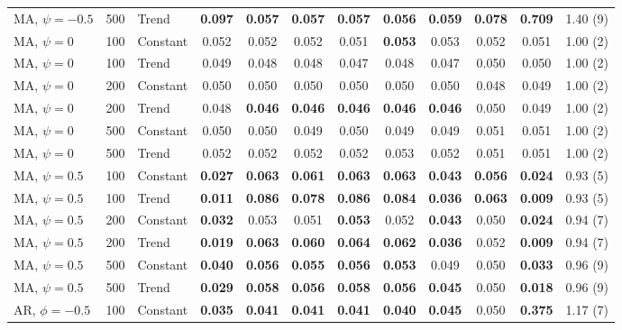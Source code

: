 \begin{tabular}{lrlccccccccc}
MA, $\psi = -0.5$ & 500 & Trend & \textbf{0.097} & \textbf{0.057} & \textbf{0.057} & \textbf{0.057} & \textbf{0.056} & \textbf{0.059} & \textbf{0.078} & \textbf{0.709} & 1.40 (9) \\
\addlinespace
MA, $\psi = 0$ & 100 & Constant & 0.052 & 0.052 & 0.052 & 0.051 & \textbf{0.053} & 0.053 & 0.052 & 0.051 & 1.00 (2) \\
MA, $\psi = 0$ & 100 & Trend & 0.049 & 0.048 & 0.048 & 0.047 & 0.048 & 0.047 & 0.050 & 0.050 & 1.00 (2) \\
MA, $\psi = 0$ & 200 & Constant & 0.050 & 0.050 & 0.050 & 0.050 & 0.050 & 0.050 & 0.048 & 0.049 & 1.00 (2) \\
MA, $\psi = 0$ & 200 & Trend & 0.048 & \textbf{0.046} & \textbf{0.046} & \textbf{0.046} & \textbf{0.046} & \textbf{0.046} & 0.050 & 0.049 & 1.00 (2) \\
MA, $\psi = 0$ & 500 & Constant & 0.050 & 0.050 & 0.049 & 0.050 & 0.049 & 0.049 & 0.051 & 0.051 & 1.00 (2) \\
MA, $\psi = 0$ & 500 & Trend & 0.052 & 0.052 & 0.052 & 0.052 & 0.053 & 0.052 & 0.051 & 0.051 & 1.00 (2) \\
\addlinespace
MA, $\psi = 0.5$ & 100 & Constant & \textbf{0.027} & \textbf{0.063} & \textbf{0.061} & \textbf{0.063} & \textbf{0.063} & \textbf{0.043} & \textbf{0.056} & \textbf{0.024} & 0.93 (5) \\
MA, $\psi = 0.5$ & 100 & Trend & \textbf{0.011} & \textbf{0.086} & \textbf{0.078} & \textbf{0.086} & \textbf{0.084} & \textbf{0.036} & \textbf{0.063} & \textbf{0.009} & 0.93 (5) \\
MA, $\psi = 0.5$ & 200 & Constant & \textbf{0.032} & 0.053 & 0.051 & \textbf{0.053} & 0.052 & \textbf{0.043} & 0.050 & \textbf{0.024} & 0.94 (7) \\
MA, $\psi = 0.5$ & 200 & Trend & \textbf{0.019} & \textbf{0.063} & \textbf{0.060} & \textbf{0.064} & \textbf{0.062} & \textbf{0.036} & 0.052 & \textbf{0.009} & 0.94 (7) \\
MA, $\psi = 0.5$ & 500 & Constant & \textbf{0.040} & \textbf{0.056} & \textbf{0.055} & \textbf{0.056} & \textbf{0.053} & 0.049 & 0.050 & \textbf{0.033} & 0.96 (9) \\
MA, $\psi = 0.5$ & 500 & Trend & \textbf{0.029} & \textbf{0.058} & \textbf{0.056} & \textbf{0.058} & \textbf{0.056} & \textbf{0.045} & 0.050 & \textbf{0.018} & 0.96 (9) \\
\addlinespace
AR, $\phi = -0.5$ & 100 & Constant & \textbf{0.035} & \textbf{0.041} & \textbf{0.041} & \textbf{0.041} & \textbf{0.040} & \textbf{0.045} & 0.050 & \textbf{0.375} & 1.17 (7) \\

\end{tabular}
